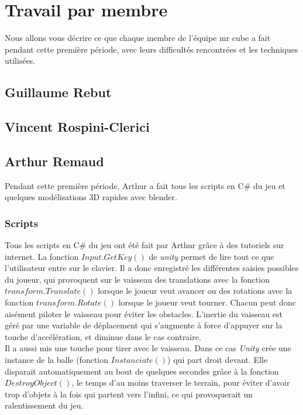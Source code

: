 \documentclass[10pt, titlepage]{report}
\begin{document}
\chapter{Travail par membre}
Nous allons vous décrire ce que chaque membre de l'équipe mr cube a fait pendant cette première période, avec leurs difficultés rencontrées et les techniques utilisées.

\section{Guillaume Rebut}

\section{Vincent Rospini-Clerici}

\section{Arthur Remaud}
Pendant cette première période, Arthur a fait tous les scripts en C\# du jeu et quelques modélisations 3D rapides avec blender.

\subsection{Scripts}
Tous les scripts en C\# du jeu ont été fait par Arthur grâce à des tutoriels sur internet. La fonction $Input.GetKey()$ de \textit{unity} permet de lire tout ce que l'utilisateur entre sur le clavier. Il a donc enregistré les différentes saisies possibles du joueur, qui provoquent sur le vaisseau des translations avec la fonction $transform.Translate()$ lorsque le joueur veut avancer ou des rotations avec la fonction $transform.Rotate()$ lorsque le joueur veut tourner. Chacun peut donc aisément piloter le vaisseau pour éviter les obstacles. L'inertie du vaisseau est géré par une variable de déplacement qui s'augmente à force d'appuyer sur la touche d'accélération, et diminue dans le cas contraire.\\

Il a aussi mis une touche pour tirer avec le vaisseau. Dans ce cas \textit{Unity} crée une instance de la balle (fonction $Instanciate()$) qui part droit devant. Elle disparait automatiquement au bout de quelques secondes grâce à la fonction $DestroyObject()$, le temps d'au moins traverser le terrain, pour éviter d'avoir trop d'objets à la fois qui partent vers l'infini, ce qui provoquerait un ralentissement du jeu.
\end{document}
